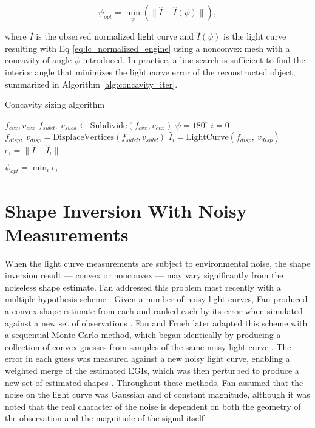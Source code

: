 \begin{equation} \label{eq:psi_opt}
  \psi_{opt} = \min_{\psi} \left( \| \hat{I} - \hat{I}(\psi) \| \right),
\end{equation}

where $\hat{I}$ is the observed normalized light curve and $\hat{I}(\psi)$ is the light curve resulting with Eq \ref{eq:lc_normalized_engine} using a nonconvex mesh with a concavity of angle $\psi$ introduced. In practice, a line search is sufficient to find the interior angle that minimizes the light curve error of the reconstructed object, summarized in Algorithm \ref{alg:concavity_iter}.

\begin{algorithm}
  \caption{Concavity sizing algorithm}\label{alg:concavity_iter}
  \begin{algorithmic}
    \State $f_{cvx},v_{cvx}$ 
    \State $f_{subd}, \:v_{subd} \gets \mathrm{Subdivide}(f_{cvx},v_{cvx})$ 
    \State $\psi = 180^\circ$ 
    \State $i = 0$ 
      \State $f_{disp}, \:v_{disp} = \mathrm{DisplaceVertices}(f_{subd},v_{subd})$
      \State $\hat{I}_{i} = \mathrm{LightCurve}(f_{disp}, \:v_{disp})$
      \State $e_i = \| \hat{I} - \hat{I}_{i} \|$
      \State{$\psi \gets \psi + \Delta \psi$}
    \EndWhile

    $\psi_{opt} = \min_i{e_i}$
  \end{algorithmic}
\end{algorithm}

\section{Shape Inversion With Noisy Measurements}

When the light curve measurements are subject to environmental noise, the shape inversion result --- convex or nonconvex --- may vary significantly from the noiseless shape estimate. Fan addressed this problem most recently with a multiple hypothesis scheme \cite{fan2020thesis}. Given a number of noisy light curves, Fan produced a convex shape estimate from each and ranked each by its error when simulated against a new set of observations \cite{fan2020thesis}. Fan and Frueh later adapted this scheme with a sequential Monte Carlo method, which began identically by producing a collection of convex guesses from samples of the same noisy light curve \cite{fan20201}. The error in each guess was measured against a new noisy light curve, enabling a weighted merge of the estimated EGIs, which was then perturbed to produce a new set of estimated shapes \cite{fan2021}. Throughout these methods, Fan assumed that the noise on the light curve was Gaussian and of constant magnitude, although it was noted that the real character of the noise is dependent on both the geometry of the observation and the magnitude of the signal itself \cite{fan2020thesis}. 

